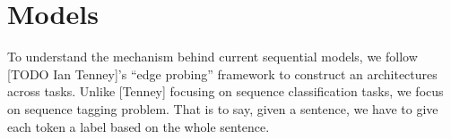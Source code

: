 \documentclass{article}
\begin{document}







\section{Models}

To understand the mechanism behind current sequential models, we follow [TODO Ian Tenney]'s ``edge probing'' framework to construct an architectures across tasks. Unlike [Tenney] focusing on sequence classification tasks, we focus on sequence tagging problem. That is to say, given a sentence, we have to give each token a label based on the whole sentence.
\end{document}
